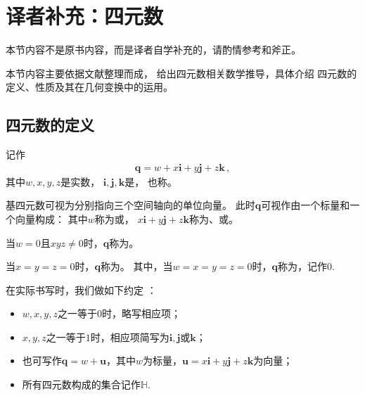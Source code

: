 \section{译者补充：四元数}\label{sec:译者补充：四元数}
\begin{remark}
    本节内容不是原书内容，而是译者自学补充的，请酌情参考和斧正。
\end{remark}

本节内容主要依据文献\citep{10.5555/90767.90913,enwiki:1013104981}整理而成，
给出四元数相关数学推导，具体介绍
四元数的定义、性质及其在几何变换中的运用。

\subsection{四元数的定义}\label{sub:四元数的定义}
\begin{definition}
    记作
    \begin{align}
        {\bm q}=w+x\mathbf{i}+y\mathbf{j}+z\mathbf{k}\, ,
    \end{align}
    其中$w, x, y, z$是实数，
    $\mathbf{i}, \mathbf{j}, \mathbf{k}$是，
    也称。

    基四元数可视为分别指向三个空间轴向的单位向量。
    此时${\bm q}$可视作由一个标量和一个向量构成：
    其中$w$称为或，
    $x\mathbf{i}+y\mathbf{j}+z\mathbf{k}$称为、或。
\end{definition}
\begin{definition}
    当$w=0$且$xyz\neq 0$时，${\bm q}$称为。
\end{definition}
\begin{definition}
    当$x=y=z=0$时，${\bm q}$称为。
    其中，当$w=x=y=z=0$时，${\bm q}$称为，记作$0$.
\end{definition}
\begin{notation}
    在实际书写时，我们做如下约定
    \protect{}：
    \begin{itemize}
        \item $w, x, y, z$之一等于$0$时，略写相应项；
        \item $x, y, z$之一等于$1$时，相应项简写为$\mathbf{i, j}$或$\mathbf{k}$；
        \item 也可写作${\bm q}=w+{\bm u}$，其中$w$为标量，${\bm u}=x\mathbf{i}+y\mathbf{j}+z\mathbf{k}$为向量；
        \item 所有四元数构成的集合记作$\mathbb{H}$.
    \end{itemize}
\end{notation}


